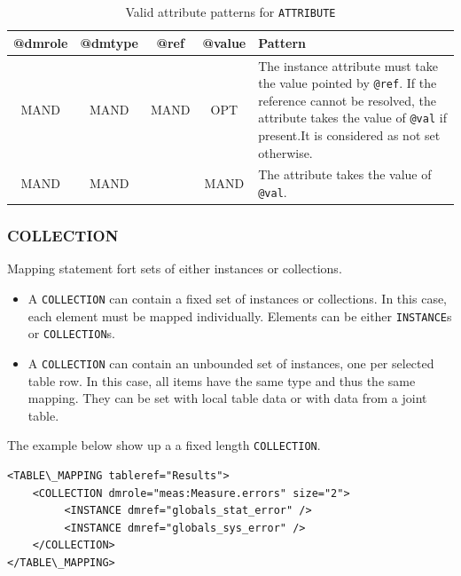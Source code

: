 \documentclass[11pt,a4paper]{ivoa}
\begin{document}
\begin{table}[!t]
\small
\centering
\begin{tabulary}{1.0\linewidth}{|c|c|c|c|J|}

    \hline    
          \textbf{@dmrole}  &  
          \textbf{@dmtype} &  
          \textbf{@ref} &  
          \textbf{@value} &  
          \textbf{Pattern}\\
    \hline   \hline 
          MAND & 
          MAND &  
          MAND &  
          OPT & 
          The instance attribute must take the value pointed by \texttt{@ref}. 
           \newline If the reference cannot be resolved, the attribute takes the value of \texttt{@val} if present.\newline  It is considered as not set otherwise.   \\
     \hline  
          MAND & 
          MAND &   
          &  
          MAND & 
          The attribute takes the value of \texttt{@val}.   \\
     \hline 
  \end{tabulary}
  \caption{Valid attribute patterns for  \texttt{ATTRIBUTE}} 
  \label{tbl:att-pattern}
 \end{table}
\FloatBarrier


%
%

\subsubsection{COLLECTION}

Mapping statement fort sets of either instances or collections.

\begin{itemize}
    \item A \texttt{COLLECTION} can contain a fixed set of instances or collections. 
            In this case, each element must be mapped individually.  
            Elements can be either \texttt{INSTANCE}s or \texttt{COLLECTION}s.
    \item A \texttt{COLLECTION} can contain an unbounded set of instances, one per selected table row. 
            In this case, all items have the same type and thus the same mapping. 
           They can be set with local table  data or with data from a joint table.
 \end{itemize}

The example below show up a a fixed length \texttt{COLLECTION}.

\begin{lstlisting}[caption={\texttt{COLLECTION} example},style=XML]
<TABLE\_MAPPING tableref="Results">
    <COLLECTION dmrole="meas:Measure.errors" size="2">
         <INSTANCE dmref="globals_stat_error" />         
         <INSTANCE dmref="globals_sys_error" />
    </COLLECTION>
</TABLE\_MAPPING>
\end{lstlisting}
\end{document}
